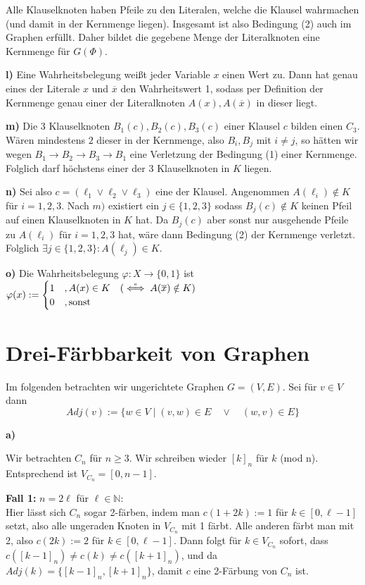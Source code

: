 \documentclass[a4paper,graphics,11pt]{article}
\newcommand{\up}[2]{\mathrel{\overset{\makebox[0pt]{\mbox{\normalfont\tiny #2}}}{#1}}}
\begin{document}
Alle Klauselknoten haben Pfeile zu den Literalen, welche die Klausel wahrmachen (und damit in der Kernmenge liegen). Insgesamt ist also Bedingung (2) auch
im Graphen erfüllt. Daher bildet die gegebene Menge der Literalknoten eine Kernmenge für $G(\Phi)$.

\textbf{l)}
Eine Wahrheitsbelegung weißt jeder Variable $x$ einen Wert zu. Dann hat genau eines der Literale $x$ und $\overline{x}$
den Wahrheitswert 1, sodass per Definition der Kernmenge genau einer der Literalknoten $A(x), A(\overline{x})$ in dieser liegt.

\textbf{m)}
Die 3 Klauselknoten $B_1(c),B_2(c),B_3(c)$ einer Klausel $c$ bilden einen $C_3$. Wären mindestens $2$ dieser in der Kernmenge,
also $B_i, B_j$ mit $i \neq j$, so hätten wir wegen $B_1 \rightarrow B_2 \rightarrow B_3 \rightarrow B_1$ eine Verletzung
der Bedingung (1) einer Kernmenge. Folglich darf höchstens einer der 3 Klauselknoten in $K$ liegen.

\textbf{n)}
Sei also $c = (\ell_1 \lor \ell_2 \lor \ell_3)$ eine der Klausel. Angenommen $A(\ell_i) \notin K$ für $i=1,2,3$.
Nach $m)$ existiert ein $j \in \{1,2,3\}$ sodass $B_j(c) \notin K$ keinen Pfeil auf einen Klauselknoten in $K$ hat.
Da $B_j(c)$ aber sonst nur ausgehende Pfeile zu $A(\ell_i)$ für $i=1,2,3$ hat, wäre dann Bedingung (2) der Kernmenge
verletzt. Folglich $\exists j \in \{1,2,3\}: A(\ell_j) \in K$.

\textbf{o)}
Die Wahrheitsbelegung $\varphi: X \to \{0,1\}$ ist $\varphi(x) := \begin{cases}1 &, A(x) \in K\quad (\up{\iff}{e} A(\overline{x}) \notin K)\\ 0 &, \text{sonst}\\\end{cases}$
\newpage

\section{Drei-Färbbarkeit von Graphen}

Im folgenden betrachten wir ungerichtete Graphen $G = (V,E)$.
Sei für $v \in V$ dann
$$
    Adj(v) := \{w \in V \mid (v,w) \in E \quad\lor\quad (w,v) \in E\}
$$

\textbf{a)}

Wir betrachten $C_n$ für $n \geq 3$. Wir schreiben wieder $[k]_n$ für $k$ (mod n).\\
Entsprechend ist $V_{C_n} = [0,n-1]$.

\textbf{Fall 1:} $n = 2\ell$ für $\ell \in \mathbb{N}$:\\
Hier lässt sich $C_n$ sogar 2-färben, indem man $c(1+2k) := 1$ für $k \in [0,\ell-1]$ setzt, also alle ungeraden
Knoten in $V_{C_n}$ mit 1 färbt. Alle anderen färbt man mit 2, also $c(2k) := 2$ für $k \in [0,\ell-1]$.
Dann folgt für $k \in V_{C_n}$ sofort, dass $c([k-1]_n) \neq c(k) \neq c([k+1]_n)$, und da $Adj(k) = \{[k-1]_n, [k+1]_n\}$, damit $c$ eine 2-Färbung
von $C_n$ ist.
\end{document}

